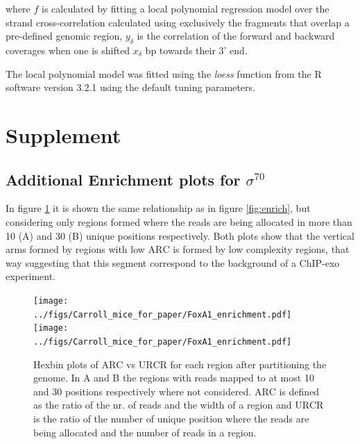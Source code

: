 \documentclass{bmcart}\usepackage[]{graphicx}\usepackage[]{color}
\begin{document}
where $f$ is calculated by fitting a local polynomial regression model
over the strand cross-correlation calculated using exclusively the
fragments that overlap a pre-defined genomic region, $y_\delta$ is the
correlation of the forward and backward coverages when one is shifted
$x_\delta$ bp towards their 3' end.

The local polynomial model was fitted using the \emph{loess} function
from the R software version 3.2.1 using the default tuning parameters.

\newpage



\nocite{exo_gb}
\nocite{maplot1}
\nocite{maplot2}


\newpage

\section*{Supplement}
\label{sec:supp}


\subsection*{Additional Enrichment plots for $\sigma^{70}$}
\label{sec:enrichsup}

In figure \ref{fig:enrich2} it is shown the same relationship as in
figure \ref{fig:enrich}, but considering only regions formed where the
reads are being allocated in more than 10 (A) and 30 (B) unique
positions respectively. Both plots show that the vertical arms formed
by regions with low $\mbox{ARC}$ is formed by low complexity regions,
that way suggesting that this segment correspond to the background of
a ChIP-exo experiment.

\begin{figure}[h!]
  \centering
  \texttt{[image: ../figs/Carroll\_mice\_for\_paper/FoxA1\_enrichment.pdf]}
  \texttt{[image: ../figs/Carroll\_mice\_for\_paper/FoxA1\_enrichment.pdf]}
  \caption{Hexbin plots of $\mbox{ARC}$ vs $\mbox{URCR}$ for each
    region after partitioning the genome. In A and B the regions with
    reads mapped to at most 10 and 30 positions respectively where not
    considered. $\mbox{ARC}$ is defined as the ratio of the nr. of
    reads and the width of a region and $\mbox{URCR}$ is the ratio of
    the number of unique position where the reads are being allocated
    and the number of reads in a region.}
  \label{fig:enrich2}
\end{figure}
\end{document}

